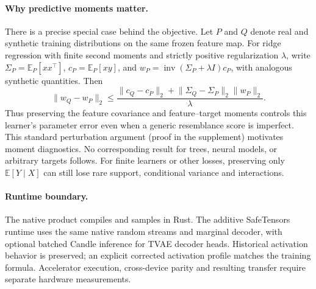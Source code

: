 \paragraph{Why predictive moments matter.}
There is a precise special case behind the objective. Let $P$ and $Q$ denote real and
synthetic training distributions on the same frozen feature map. For ridge regression
with finite second moments and strictly positive regularization $\lambda$, write
$\Sigma_P=\mathbb{E}_P[xx^\top]$, $c_P=\mathbb{E}_P[xy]$, and
$w_P=\operatorname{inv}(\Sigma_P+\lambda I)c_P$, with analogous synthetic quantities. Then
\begin{equation}
 \lVert w_Q-w_P\rVert_2\leq
 \frac{\lVert c_Q-c_P\rVert_2+
       \lVert\Sigma_Q-\Sigma_P\rVert_2\lVert w_P\rVert_2}{\lambda}.
 \label{eq:ridge}
\end{equation}
Thus preserving the feature covariance and feature--target moments controls this
learner's parameter error even when a generic resemblance score is imperfect. This
standard perturbation argument (proof in the supplement) motivates moment diagnostics.
No corresponding result for trees, neural models, or arbitrary targets follows. For finite learners or other losses, preserving only
$\mathbb{E}[Y\mid X]$ can still lose rare support, conditional variance and interactions.

\paragraph{Runtime boundary.}
The native product compiles and samples in Rust. The additive SafeTensors runtime uses
the same native random streams and marginal decoder, with optional batched Candle
inference for TVAE decoder heads. Historical activation behavior is preserved; an
explicit corrected activation profile matches the training formula. Accelerator execution,
cross-device parity and resulting transfer require separate hardware measurements.
